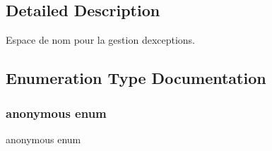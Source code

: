 \subsection{Detailed Description}
Espace de nom pour la gestion d\textquotesingle{}exceptions. 

\subsection{Enumeration Type Documentation}
\mbox{\label{namespacens_exception_ae4cd0d6bbd5590a1b121347632d41376}} 
\subsubsection{\texorpdfstring{anonymous enum}{anonymous enum}}
{\footnotesize\ttfamily anonymous enum}


